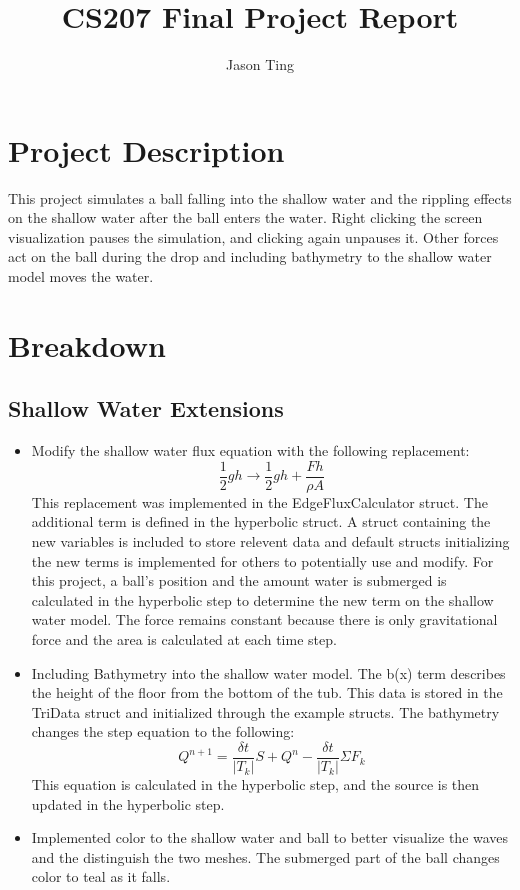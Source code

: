 \documentclass[12pt,letterpaper]{article}
\title{\textbf{CS207 Final Project Report}}
\author{Jason Ting}
\date{}
\begin{document}
\maketitle{}


\section*{Project Description}
This project simulates a ball falling into the shallow water and the rippling effects on the shallow water after the ball enters the water. Right clicking the screen visualization pauses the simulation, and clicking again unpauses it. Other forces act on the ball during the drop and including bathymetry to the shallow water model moves the water. 


\section*{Breakdown}
\subsection*{Shallow Water Extensions}
\begin{itemize}
\item Modify the shallow water flux equation with the following replacement:
\begin{equation}
\frac{1}{2}gh \to \frac{1}{2}gh + \frac{Fh}{\rho A}
\end{equation}
This replacement was implemented in the EdgeFluxCalculator struct. The additional term is defined in the hyperbolic struct. A struct containing the new variables is included to store relevent data and default structs initializing the new terms is implemented for others to potentially use and modify. For this project, a ball's position and the amount water is submerged is calculated in the hyperbolic step to determine the new term on the shallow water model. The force remains constant because there is only gravitational force and the area is calculated at each time step. 
\item Including Bathymetry into the shallow water model. The b(x) term describes the height of the floor from the bottom of the tub. This data is stored in the TriData struct and initialized through the example structs. The bathymetry changes the step equation to the following:
\begin{equation}
Q^{n+1} = \frac{\delta t}{|T_k|}S + Q^n - \frac{\delta t}{|T_k|}\Sigma F_k
\end{equation}
This equation is calculated in the hyperbolic step, and the source is then updated in the hyperbolic step.
\item Implemented color to the shallow water and ball to better visualize the waves and the distinguish the two meshes. The submerged part of the ball changes color to teal as it falls. 
\end{itemize}
\end{document}
